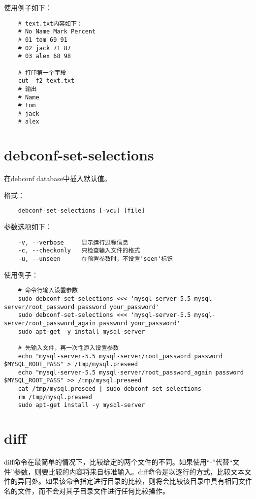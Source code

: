 \documentclass[a4paper,left=2.5cm,right=2.5cm,11pt]{article}
\begin{document}
	使用例子如下：
	\begin{lstlisting}
	# text.txt内容如下：
	# No Name Mark Percent 
	# 01 tom 69 91 
	# 02 jack 71 87 
	# 03 alex 68 98
	
	# 打印第一个字段
	cut -f2 text.txt
	# 输出
	# Name
	# tom
	# jack
	# alex
	\end{lstlisting}

\section{debconf-set-selections}
	在debconf database中插入默认值。\par

	格式：
	\begin{lstlisting}
	debconf-set-selections [-vcu] [file]
	\end{lstlisting}

	参数选项如下：
	\begin{lstlisting}
	-v, --verbose     显示运行过程信息
	-c, --checkonly   只检查输入文件的格式
	-u, --unseen      在预置参数时，不设置'seen'标识
	\end{lstlisting}

	使用例子：
	\begin{lstlisting}
	# 命令行输入设置参数
	sudo debconf-set-selections <<< 'mysql-server-5.5 mysql-server/root_password password your_password'
	sudo debconf-set-selections <<< 'mysql-server-5.5 mysql-server/root_password_again password your_password'
	sudo apt-get -y install mysql-server

	# 先输入文件，再一次性添入设置参数
	echo "mysql-server-5.5 mysql-server/root_password password $MYSQL_ROOT_PASS" > /tmp/mysql.preseed
	echo "mysql-server-5.5 mysql-server/root_password_again password $MYSQL_ROOT_PASS" >> /tmp/mysql.preseed
	cat /tmp/mysql.preseed | sudo debconf-set-selections
	rm /tmp/mysql.preseed
	sudo apt-get install -y mysql-server
	\end{lstlisting}

\section{diff}
	diff命令在最简单的情况下，比较给定的两个文件的不同。如果使用“-”代替“文件”参数，则要比较的内容将来自标准输入。diff命令是以逐行的方式，比较文本文件的异同处。如果该命令指定进行目录的比较，则将会比较该目录中具有相同文件名的文件，而不会对其子目录文件进行任何比较操作。\par
\end{document}
